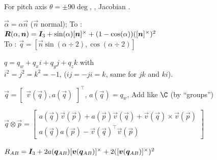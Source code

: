 For pitch axis $\theta = \pm 90\deg$, , Jacobian .

$\vec{\alpha} = \alpha \vec{n}$ ($\vec{n}$ normal); To :\\
$\bm{R}(\alpha, \bm{n}) = \bm{I}_3 + \sin(\alpha)[\bm{n}]^\times + (1 - \cos(\alpha))([\bm{n}]^\times)^2$\\
To : $\vec{q} = [\vec{n} \sin(\alpha \div 2), \cos(\alpha \div 2)]$


\shortdefinition[Quaternions] $q = q_w + q_x i + q_y j + q_z k$ with\\
$i^2 = j^2 = k^2 = -1$, ($ij = -ji = k$, same for $jk$ and $ki$).

$\vec{q} = \begin{bmatrix}
        \vec{v}(\vec{q}), a(\vec{q})
    \end{bmatrix}^\top$, $a(\vec{q}) = q_w$, Add like $\C$ (by ``groups'')

 {\scriptsize
    $\vec{q} \otimes \vec{p} = \begin{bmatrix}
            a(\vec{q}) \vec{v}(\vec{p}) + a(\vec{p})\vec{v}(\vec{q}) + \vec{v}(\vec{q}) \times \vec{v}(\vec{p}) \\
            a(\vec{q}) a(\vec{p}) - \vec{v}(\vec{q})^\top \vec{v}(\vec{p})
        \end{bmatrix}$
}

 {
    $R_{AB} = \bm{I}_3 + 2a(\bm{q}_{AB}) [\bm{v}(\bm{q}_{AB})]^\times + 2([\bm{v}(\bm{q}_{AB})]^\times)^2$
}


